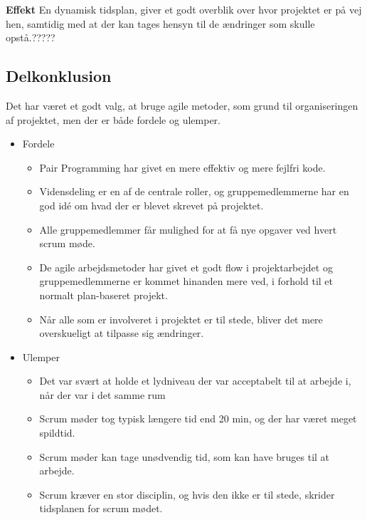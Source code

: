 \textbf{Effekt}
En dynamisk tidsplan, giver et godt overblik over hvor projektet er på vej hen, samtidig med at der kan tages hensyn til de ændringer som skulle opstå.?????

\subsection{Delkonklusion}
Det har været et godt valg, at bruge agile metoder, som grund til organiseringen af projektet, men der er både fordele og ulemper.\\

\begin{itemize}
	\item Fordele
\begin{itemize}
	\item Pair Programming har givet en mere effektiv og mere fejlfri kode.
	\item Vidensdeling er en af de centrale roller, og gruppemedlemmerne har en god idé om hvad der er blevet skrevet på 					  projektet.
	\item Alle gruppemedlemmer får mulighed for at få nye opgaver ved hvert scrum møde.
	\item De agile arbejdsmetoder har givet et godt flow i projektarbejdet og gruppemedlemmerne er kommet 					  hinanden mere ved, i forhold til et normalt plan-baseret projekt.
	\item Når alle som er involveret i projektet er til stede, bliver det mere overskueligt at tilpasse sig ændringer.
\end{itemize}

	\item Ulemper
\begin{itemize}
	\item Det var svært at holde et lydniveau der var acceptabelt til at arbejde i, når der var i det samme rum
	\item Scrum møder tog typisk længere tid end 20 min, og der har været meget spildtid.
	\item Scrum møder kan tage unødvendig tid, som kan have bruges til at arbejde.
	\item Scrum kræver en stor disciplin, og hvis den ikke er til stede, skrider tidsplanen for scrum mødet.
\end{itemize}
\end{itemize}
